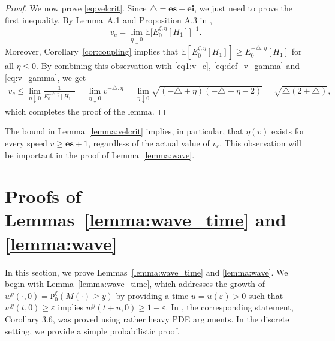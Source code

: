 \documentclass[12pt,reqno,oneside]{amsart}
\numberwithin{equation}{section}
\theoremstyle{definition}
\theoremstyle{remark}
\newcommand{\E}{\mathbb{E}}
\newcommand{\es}{\mathbf{es}}
\newcommand{\ei}{\mathbf{ei}}
\begin{document}
\begin{proof}
  We now prove \eqref{eq:velcrit}.
  Since $\triangle=\es- \ei$, we just need to prove the first inequality. By
  Lemma~A.1 and Proposition A.3 in \cite{CD20},
  \begin{equation}
    \label{eq1:v_c}
    v_c=\lim_{\eta \downarrow 0} \E\Big[E_0^{\zeta, \eta }[H_1]\Big]^{-1}.
  \end{equation}
  Moreover, Corollary~\ref{cor:coupling} implies that
  $\E[E_0^{\zeta,\eta}[H_1]] \geq E_0^{-\triangle,\eta}[H_1]$ for all
  $ \eta \leq 0$.  By combining this observation with \eqref{eq1:v_c}, \eqref{eq:def_v_gamma} and \eqref{eq:v_gamma}, we get
  \begin{align*}
    v_c \leq \lim_{\eta \downarrow 0}  \frac{1}{E_0^{-\triangle,\eta}[H_1]}
    = \lim_{\eta \downarrow 0} v^{- \triangle,\eta} =\lim_{\eta \downarrow 0}\sqrt{(-\triangle+\eta)(-\triangle+\eta-2)}
    = \sqrt{\triangle(2+\triangle)},
  \end{align*}
  which completes the proof of the lemma.
\end{proof}

The bound in Lemma~\ref{lemma:velcrit} implies, in
particular, that $\overline{\eta}(v)$ exists for every speed $v\geq\es +1$,
regardless of the actual value of $v_c$. This observation will be important
in the proof of Lemma~\ref{lemma:wave}.

\section{Proofs of Lemmas~\ref{lemma:wave_time} and \ref{lemma:wave}}
\label{sec:proof_prop_and_lemma}

In this section, we prove Lemmas~\ref{lemma:wave_time} and \ref{lemma:wave}.
We begin with Lemma~\ref{lemma:wave_time},  which addresses the growth of
$w^y(\cdot,0)=\mathtt{P}_0^\xi(M(\cdot ) \geq y)$ by providing a time
$u=u(\varepsilon)>0$ such that $w^y(t,0) \geq \varepsilon$ implies
$w^y(t+u,0)\geq 1-\varepsilon$.
In \cite{CDO25}, the corresponding statement, Corollary 3.6, was
   proved using rather heavy PDE arguments. In the discrete setting, we
   provide a simple probabilistic proof.
\end{document}
